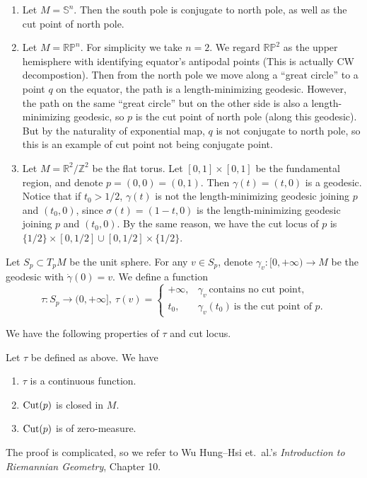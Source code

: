 \begin{eg}\label{eg of cut pts}
    \begin{enumerate}[(1)]
        \item Let $M=\mathbb{S}^n$.
        Then the south pole is conjugate to north pole, as well as the cut point of north pole.
        \item Let $M=\mathbb{RP}^n$.
        For simplicity we take $n=2$.
        We regard $\mathbb{RP}^2$ as the upper hemisphere with identifying equator's antipodal points (This is actually CW decompostion).
        Then from the north pole we move along a ``great circle'' to a point $q$ on the equator, the path is a length-minimizing geodesic.
        However, the path on the same ``great circle'' but on the other side is also a length-minimizing geodesic, so $p$ is the cut point of north pole (along this geodesic).
        But by the naturality of exponential map, $q$ is not conjugate to north pole, so this is an example of cut point not being conjugate point.
        \item Let $M=\mathbb{R}^2/\mathbb{Z}^2$ be the flat torus.
        Let $[0,1]\times[0,1]$ be the fundamental region, and denote $p=(0,0)=(0,1)$.
        Then $\gamma(t)=(t,0)$ is a geodesic.
        Notice that if $t_0>1/2$, $\gamma(t)$ is not the length-minimizing geodesic joining $p$ and $(t_0,0)$, since $\sigma(t)=(1-t,0)$ is the length-minimizing geodesic joining $p$ and $(t_0,0)$.
        By the same reason, we have the cut locus of $p$ is $\{1/2\}\times[0,1/2]\cup[0,1/2]\times\{1/2\}$.
    \end{enumerate}
\end{eg}

Let $S_p\subset T_pM$ be the unit sphere.
For any $v\in S_p$, denote $\gamma_v:[0,+\infty)\to M$ be the geodesic with $\dot{\gamma}(0)=v$.
We define a function
\[\tau:S_p\to(0,+\infty],\ \tau(v)=\begin{cases}
    +\infty, & \gamma_v\ \text{contains no cut point},\\
    t_0, & \gamma_v(t_0)\ \text{is the cut point of }p.
\end{cases}\]

We have the following properties of $\tau$ and cut locus.
\begin{prop}
    Let $\tau$ be defined as above. We have
    \begin{enumerate}[(1)]
        \item $\tau$ is a continuous function.
        \item $\operatorname{Cut}(p)$ is closed in $M$.
        \item $\operatorname{Cut}(p)$ is of zero-measure.
    \end{enumerate}
\end{prop}
The proof is complicated, so we refer to Wu Hung--Hsi et.\ al.'s \emph{Introduction to Riemannian Geometry}, Chapter 10.

